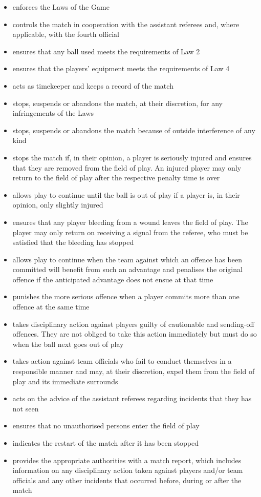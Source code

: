 \begin{itemize}
    \item enforces the Laws of the Game
    \item controls the match in cooperation with the assistant referees and, where applicable, with the fourth official
    \item ensures that any ball used meets the requirements of Law 2
    \item ensures that the players' equipment meets the requirements of Law 4
    \item acts as timekeeper and keeps a record of the match
    \item stops, suspends or abandons the match, at their discretion, for any infringements of the Laws
    \item stops, suspends or abandons the match because of outside interference of any kind
    \item stops the match if, in their opinion, a player is seriously injured and ensures that they are removed from the field of play. An injured player may only return to the field of play after the respective penalty time is over 
    \item allows play to continue until the ball is out of play if a player is, in their opinion, only slightly injured
    \item ensures that any player bleeding from a wound leaves the field of play. The player may only return on receiving a signal from the referee, who must be satisfied that the bleeding has stopped
    \item allows play to continue when the team against which an offence has been committed will benefit from such an advantage and penalises the original offence if the anticipated advantage does not ensue at that time
    \item punishes the more serious offence when a player commits more than one offence at the same time
    \item takes disciplinary action against players guilty of cautionable and sending-off offences. They are not obliged to take this action immediately but must do so when the ball next goes out of play
    \item takes action against team officials who fail to conduct themselves in a responsible manner and may, at their discretion, expel them from the field of play and its immediate surrounds
    \item acts on the advice of the assistant referees regarding incidents that they has not seen
    \item ensures that no unauthorised persons enter the field of play
    \item indicates the restart of the match after it has been stopped
    \item provides the appropriate authorities with a match report, which includes information on any disciplinary action taken against players and/or team officials and any other incidents that occurred before, during or after
    the match
\end{itemize}

